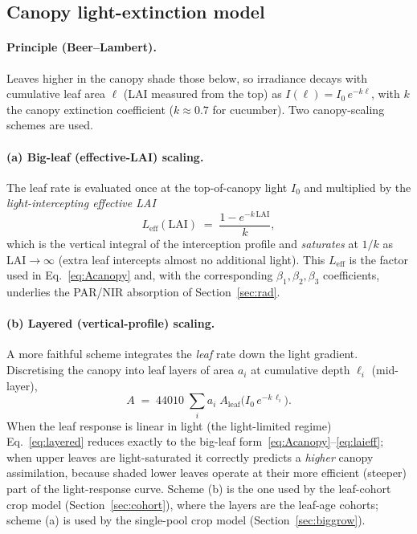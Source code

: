 \documentclass[11pt,a4paper]{article}
\begin{document}
\subsection{Canopy light-extinction model}\label{sec:lightext}
\paragraph{Principle (Beer--Lambert).} Leaves higher in the canopy shade those below, so irradiance
decays with cumulative leaf area $\ell$ (LAI measured from the top) as $I(\ell)=I_0\,e^{-k\ell}$,
with $k$ the canopy extinction coefficient ($k\approx0.7$ for cucumber). Two canopy-scaling schemes
are used.

\paragraph{(a) Big-leaf (effective-LAI) scaling.} The leaf rate is evaluated once at the
top-of-canopy light $I_0$ and multiplied by the \emph{light-intercepting effective LAI}
\begin{equation}
  L_{\text{eff}}(\mathrm{LAI}) \;=\; \frac{1-e^{-k\,\mathrm{LAI}}}{k},
  \label{eq:laieff}
\end{equation}
which is the vertical integral of the interception profile and \emph{saturates} at $1/k$ as
LAI$\to\infty$ (extra leaf intercepts almost no additional light). This $L_{\text{eff}}$ is the
factor used in Eq.~\eqref{eq:Acanopy} and, with the corresponding $\beta_1,\beta_2,\beta_3$
coefficients, underlies the PAR/NIR absorption of Section~\ref{sec:rad}.

\paragraph{(b) Layered (vertical-profile) scaling.} A more faithful scheme integrates the
\emph{leaf} rate down the light gradient. Discretising the canopy into leaf layers of area $a_i$ at
cumulative depth $\ell_i$ (mid-layer),
\begin{equation}
  A \;=\; 44010\;\sum_i a_i\; A_{\text{leaf}}\!\big(I_0\,e^{-k\,\ell_i}\big).
  \label{eq:layered}
\end{equation}
When the leaf response is linear in light (the light-limited regime) Eq.~\eqref{eq:layered} reduces
exactly to the big-leaf form~\eqref{eq:Acanopy}--\eqref{eq:laieff}; when upper leaves are
light-saturated it correctly predicts a \emph{higher} canopy assimilation, because shaded lower
leaves operate at their more efficient (steeper) part of the light-response curve. Scheme (b) is the
one used by the leaf-cohort crop model (Section~\ref{sec:cohort}), where the layers are the leaf-age
cohorts; scheme (a) is used by the single-pool crop model (Section~\ref{sec:biggrow}).
\end{document}

